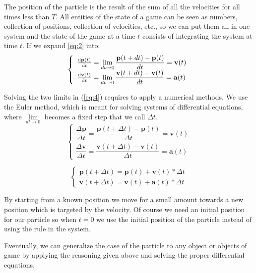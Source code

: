 \documentclass[10pt,a4paper]{article}
\begin{document}
\noindent
The position of the particle is the result of the sum of all the velocities for all times less than $T$. All entities of the state of a game can be seen as numbers, collection of positions, collection of velocities, etc., so we can put them all in one system and the state of the game at a time $t$ consists of integrating the system at time $t$. If we expand \ref{eq:2} into:
\begin{equation}\label{eq:4}
\left \lbrace
\begin{array}{l}
\dv{\mathbf{p}(t)}{t} = \lim\limits_{dt \to 0} \dfrac{\mathbf{p}(t + dt) - \mathbf{p}(t)}{dt} = \mathbf{v}(t)\\
\dv{\mathbf{v}(t)}{t} = \lim\limits_{dt \to 0} \dfrac{\mathbf{v}(t + dt) - \mathbf{v}(t)}{dt} = \mathbf{a}(t)
\end{array}
\right.
\end{equation}

Solving the two limits in (\ref{eq:4}) requires to apply a numerical methods. We use the Euler method, which is meant for solving systems of differential equations, where $\lim\limits_{dt \to 0}$ becomes a fixed step that we call $\Delta t$.
\begin{equation}\label{eq:5}
\begin{cases}
\dfrac{\Delta \mathbf{p}}{\Delta t} = \dfrac{\mathbf{p}(t + \Delta t) - \mathbf{p}(t)}{\Delta t} = \mathbf{v}(t)\\
\dfrac{\Delta \mathbf{v}}{\Delta t} = \dfrac{\mathbf{v}(t + \Delta t) - \mathbf{v}(t)}{\Delta t} =  \mathbf{a}(t)
\end{cases}
\end{equation}

\begin{equation}\label{eq:6}
\begin{cases}
\mathbf{p}(t + \Delta t) = \mathbf{p}(t) + \mathbf{v}(t) * \Delta t\\
\mathbf{v}(t + \Delta t) = \mathbf{v}(t) + \mathbf{a}(t) * \Delta t
\end{cases}
\end{equation}

By starting from a known position we move for a small amount towards a new position which is targeted by the velocity. Of course we need an initial position for our particle so when $t=0$ we use the initial position of the particle instead of using the rule in the system.

Eventually, we can generalize the case of the particle to any object or objects of game by applying the reasoning given above and solving the proper differential equations.
\end{document}
